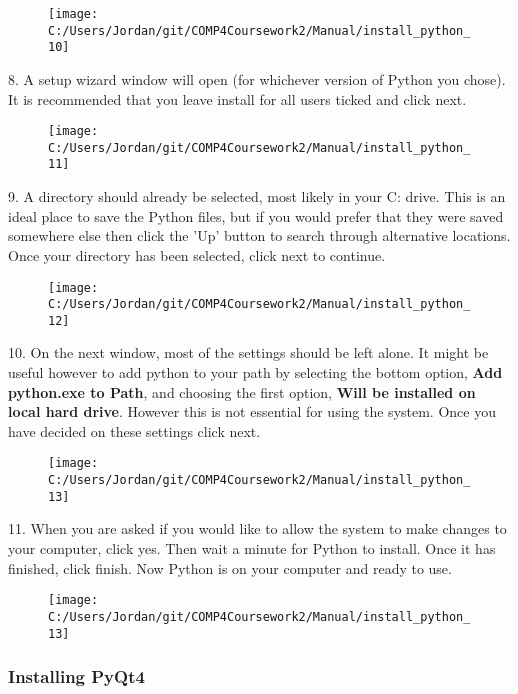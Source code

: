\begin{figure}[H]
    \texttt{[image: C:/Users/Jordan/git/COMP4Coursework2/Manual/install\_python\_10]}
\end{figure}

8. A setup wizard window will open (for whichever version of Python you chose). It is recommended that you leave install for all users ticked and click next.

\begin{figure}[H]
    \texttt{[image: C:/Users/Jordan/git/COMP4Coursework2/Manual/install\_python\_11]}
\end{figure}

9. A directory should already be selected, most likely in your C: drive. This is an ideal place to save the Python files, but if you would prefer that they were saved somewhere else then click the 'Up' button to search through alternative locations. Once your directory has been selected, click next to continue.

\begin{figure}[H]
    \texttt{[image: C:/Users/Jordan/git/COMP4Coursework2/Manual/install\_python\_12]}
\end{figure}

10. On the next window, most of the settings should be left alone. It might be useful however to add python to your path by selecting the bottom option, \textbf{Add python.exe to Path}, and choosing the first option, \textbf{Will be installed on local hard drive}. However this is not essential for using the system. Once you have decided on these settings click next.

\begin{figure}[H]
    \texttt{[image: C:/Users/Jordan/git/COMP4Coursework2/Manual/install\_python\_13]}
\end{figure}

11. When you are asked if you would like to allow the system to make changes to your computer, click yes. Then wait a minute for Python to install. Once it has finished, click finish. Now Python is on your computer and ready to use.

\begin{figure}[H]
    \texttt{[image: C:/Users/Jordan/git/COMP4Coursework2/Manual/install\_python\_13]}
\end{figure}

\subsubsection{Installing PyQt4}

